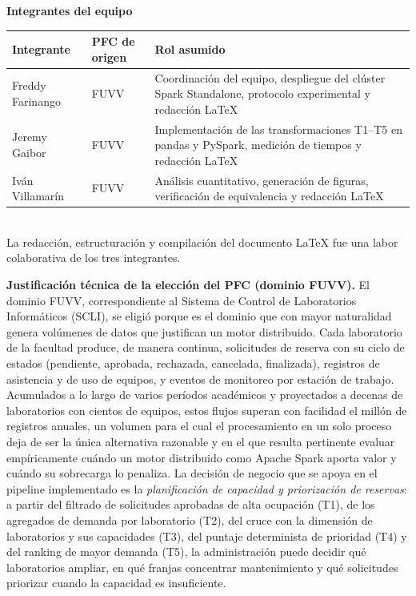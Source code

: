 \documentclass[10pt,journal]{IEEEtran}
\begin{document}
\begin{center}
{\large \textbf{Integrantes del equipo}}\\[0.4em]
\begin{tabular}{@{}llp{}@{}}
\toprule
\textbf{Integrante} & \textbf{PFC de origen} & \textbf{Rol asumido}\\
\midrule
Freddy Farinango & FUVV & Coordinaci\'on del equipo, despliegue del cl\'uster Spark
Standalone, protocolo experimental y redacci\'on \LaTeX\\[0.3em]
Jeremy Gaibor & FUVV & Implementaci\'on de las transformaciones T1--T5 en pandas y
PySpark, medici\'on de tiempos y redacci\'on \LaTeX\\[0.3em]
Iv\'an Villamar\'in & FUVV & An\'alisis cuantitativo, generaci\'on de figuras,
verificaci\'on de equivalencia y redacci\'on \LaTeX\\
\bottomrule
\end{tabular}\\[0.6em]
{\footnotesize La redacci\'on, estructuraci\'on y compilaci\'on del documento \LaTeX{}
fue una labor colaborativa de los tres integrantes.}
\end{center}

\vspace{1.5em}
\noindent\textbf{Justificaci\'on t\'ecnica de la elecci\'on del PFC (dominio FUVV).}
El dominio FUVV, correspondiente al Sistema de Control de Laboratorios
Inform\'aticos (SCLI), se eligi\'o porque es el dominio que con mayor naturalidad
genera vol\'umenes de datos que justifican un motor distribuido. Cada laboratorio de la
facultad produce, de manera continua, solicitudes de reserva con su ciclo de estados
(pendiente, aprobada, rechazada, cancelada, finalizada), registros de asistencia y de uso
de equipos, y eventos de monitoreo por estaci\'on de trabajo. Acumulados a lo largo de
varios per\'iodos acad\'emicos y proyectados a decenas de laboratorios con cientos de
equipos, estos flujos superan con facilidad el mill\'on de registros anuales, un volumen
para el cual el procesamiento en un solo proceso deja de ser la \'unica alternativa
razonable y en el que resulta pertinente evaluar emp\'iricamente cu\'ando un motor
distribuido como Apache Spark aporta valor y cu\'ando su sobrecarga lo penaliza. La
decisi\'on de negocio que se apoya en el pipeline implementado es la \emph{planificaci\'on
de capacidad y priorizaci\'on de reservas}: a partir del filtrado de solicitudes aprobadas
de alta ocupaci\'on (T1), de los agregados de demanda por laboratorio (T2), del cruce con
la dimensi\'on de laboratorios y sus capacidades (T3), del puntaje determinista de
prioridad (T4) y del ranking de mayor demanda (T5), la administraci\'on puede decidir qu\'e
laboratorios ampliar, en qu\'e franjas concentrar mantenimiento y qu\'e solicitudes
priorizar cuando la capacidad es insuficiente.
\end{document}
